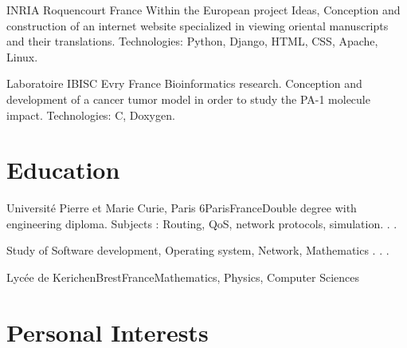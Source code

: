 \documentclass[10pt,a4paper,sans]{moderncv}        %
\begin{document}
              {INRIA}
              {Roquencourt}
              {France}
              {Within the European project Ideas, Conception and construction of an
               internet website specialized in viewing oriental manuscripts and their
               translations.
                 \newline Technologies: Python, Django, HTML, CSS, Apache, Linux.
              }

              {Laboratoire IBISC}
              {Evry}
              {France}
              {Bioinformatics research. Conception
               and development of a cancer tumor model in order to
               study the PA-1 molecule impact.
                \newline Technologies: C, Doxygen.
              }

\section{Education}
{Université Pierre et Marie Curie, Paris 6}{Paris}{France}{Double degree with engineering diploma. Subjects : Routing, QoS, network protocols, simulation. . .}

{Study of Software development, Operating system, Network, Mathematics . . .}

{Lycée de Kerichen}{Brest}{France}{Mathematics, Physics, Computer Sciences}

\section{Personal Interests}
\end{document}
